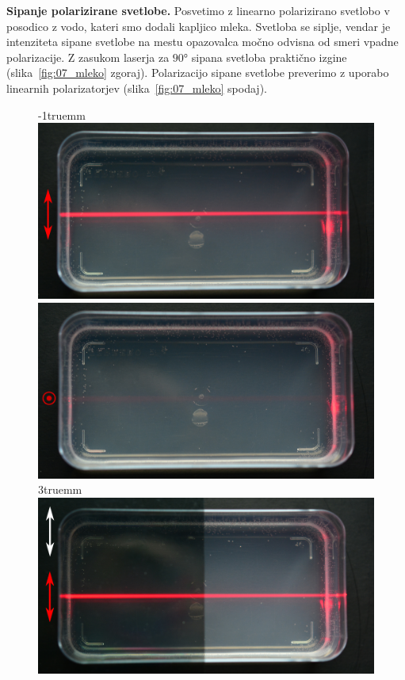 \begin{example}{\bf Sipanje polarizirane svetlobe.} Posvetimo z linearno polarizirano
svetlobo v posodico z vodo, kateri smo dodali kapljico mleka. Svetloba se siplje,
vendar je intenziteta sipane svetlobe na mestu opazovalca močno odvisna
od smeri vpadne polarizacije. Z zasukom laserja za $90\si{\degree}$
sipana svetloba praktično izgine (slika~\ref{fig:07_mleko} zgoraj). 
Polarizacijo sipane svetlobe preverimo z uporabo linearnih polarizatorjev 
(slika~\ref{fig:07_mleko} spodaj). 
\begin{figure}[!h]
\centering
\vglue-1truemm
\includegraphics[width=7truecm]{slike/07_Mleko1.jpg}\hfill
\includegraphics[width=7truecm]{slike/07_Mleko2.jpg}\\ \vglue3truemm
\includegraphics[width=7truecm]{slike/07_Mleko3.jpg}\hfill

\end{figure}
\end{example}
